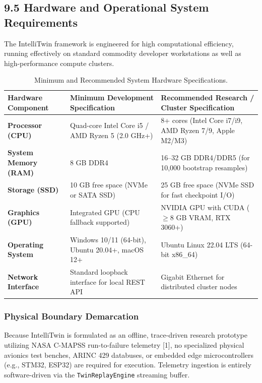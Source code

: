 \documentclass[12pt,a4paper]{article}
\begin{document}
\subsection*{9.5 Hardware and Operational System Requirements}
The IntelliTwin framework is engineered for high computational efficiency, running effectively on standard commodity developer workstations as well as high-performance compute clusters.

\begin{table}[htbp]
\centering
\caption{Minimum and Recommended System Hardware Specifications.}
\label{tab:system_requirements}
\small
\begin{tabularx}{\textwidth}{lXX}
\toprule
\textbf{Hardware Component} & \textbf{Minimum Development Specification} & \textbf{Recommended Research / Cluster Specification} \\
\midrule
\textbf{Processor (CPU)} & Quad-core Intel Core i5 / AMD Ryzen 5 (2.0 GHz+) & 8+ cores (Intel Core i7/i9, AMD Ryzen 7/9, Apple M2/M3) \\
\textbf{System Memory (RAM)} & 8 GB DDR4 & 16--32 GB DDR4/DDR5 (for 10,000 bootstrap resamples) \\
\textbf{Storage (SSD)} & 10 GB free space (NVMe or SATA SSD) & 25 GB free space (NVMe SSD for fast checkpoint I/O) \\
\textbf{Graphics (GPU)} & Integrated GPU (CPU fallback supported) & NVIDIA GPU with CUDA ($\ge 8$ GB VRAM, RTX 3060+) \\
\textbf{Operating System} & Windows 10/11 (64-bit), Ubuntu 20.04+, macOS 12+ & Ubuntu Linux 22.04 LTS (64-bit x86\_64) \\
\textbf{Network Interface} & Standard loopback interface for local REST API & Gigabit Ethernet for distributed cluster nodes \\
\bottomrule
\end{tabularx}
\end{table}

\subsubsection*{Physical Boundary Demarcation}
Because IntelliTwin is formulated as an offline, trace-driven research prototype utilizing NASA C-MAPSS run-to-failure telemetry [1], no specialized physical avionics test benches, ARINC 429 databuses, or embedded edge microcontrollers (e.g., STM32, ESP32) are required for execution. Telemetry ingestion is entirely software-driven via the \texttt{TwinReplayEngine} streaming buffer.
\end{document}
